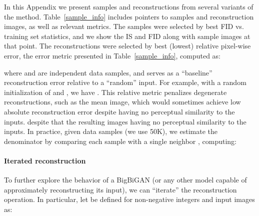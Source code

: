 \begin{table*}
\centering
{}
 \caption{
  Links to \method{} samples and reconstructions with associated metrics.
 }
 \label{sample_info}
\end{table*}

In this Appendix we present \method{} samples and reconstructions from several variants of the method.
Table~\ref{sample_info} includes pointers to samples and reconstruction images, as well as relevant metrics.
The samples were selected by best FID vs. training set statistics,
and we show the IS and FID along with sample images at that point.
The reconstructions were selected by best (lowest) relative pixel-wise  error, the error metric presented in Table~\ref{sample_info}, computed as:

where  and  are independent data samples, and  serves as a ``baseline'' reconstruction error relative to a ``random'' input.
For example, with a random initialization of  and , we have .
This relative metric penalizes degenerate reconstructions, such as the mean image, which would sometimes achieve low absolute reconstruction error despite having no perceptual similarity to the inputs.
despite that the resulting images having no perceptual similarity to the inputs.
In practice, given  data samples  (we use  50K),
we estimate the denominator by comparing each sample  with a single neighbor , computing:


\paragraph{Iterated reconstruction}
To further explore the behavior of a BigBiGAN (or any other model capable of approximately reconstructing its input),
we can ``iterate'' the reconstruction operation.
In particular, let  be defined for non-negative integers  and input images  as:


